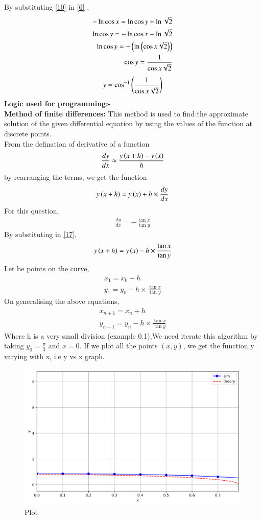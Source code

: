\documentclass[journal]{IEEEtran}
\begin{document}
By substituting \eqref{10} in \eqref{6} , 
\begin{align}
- \ln{\cos{x}} = \ln{\cos{y}} + \ln{\sqrt{2}} \\
\ln{\cos{y}} = - \ln{\cos{x}} - \ln{\sqrt{2}} \\
\ln{\cos{y}} = - \left(\ln{\ensuremath{\left(\cos{x}\sqrt{2}\right)}}\right) \\
\cos{y} = \frac{1}{\cos{x}\sqrt{2}} \label{14}
\end{align}
\begin{align}
    y = \cos^{-1}\left({\frac{1}{\cos{x}\sqrt{2}}}\right) \label{15}
\end{align}
\textbf{Logic used for programming:-} \\
\textbf{Method of finite differences:} This method is used to find the approximate solution of the given differential equation by using the values of the function at discrete points.  \\
From the defination of derivative of a function 
\begin{align}
\frac{dy}{dx} \approx \frac{y\left(x+h\right)-y\left(x\right)}{h} \label{11}
\end{align}
by rearranging the terms, we get the function
\begin{align}
y\left(x+h\right)=y\left(x\right)+h \times \frac{dy}{dx} \label{17}
\end{align}
For this question, 
\begin{align}
\frac{dy}{dx} = - \frac{\tan{x}}{\tan{y}}
\end{align}
By substituting in \eqref{17},
\begin{align}
y\left(x+h\right)=y\left(x\right) - h \times \frac{\tan{x}}{\tan{y}}
\end{align}
Let  be points on the curve,
\begin{align}
x_1=x_0+h \\
y_1=y_0 - h \times \frac{\tan{x}}{\tan{y}}
\end{align}
On  generalising the above equations,
\begin{align}
x_{n+1}=x_{n}+h \\
y_{n+1}=y_{n} - h \times \frac{\tan{x}}{\tan{y}}
\end{align}
Where h is a very small division (example 0.1),We need iterate this algorithm by taking $y_0=\frac{\pi}{4}$ and $x=0$.
If we plot all the points $(x,y)$, we get the function y varying with x, i.e y vs x graph. \\


\begin{figure}[htbp] %
    \centering
    \includegraphics[width=\textwidth]{figs/plot.png} %
    \caption{Plot}
\end{figure}
\end{document}
